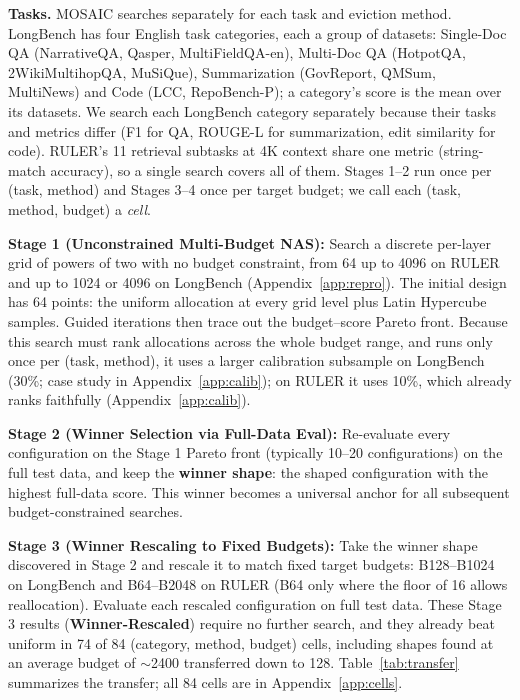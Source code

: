 \documentclass[11pt]{article}
\begin{document}
\textbf{Tasks.}\label{sec:method-tasks} MOSAIC searches separately for each task and eviction method. LongBench has four English task categories, each a group of datasets: Single-Doc QA (NarrativeQA, Qasper, MultiFieldQA-en), Multi-Doc QA (HotpotQA, 2WikiMultihopQA, MuSiQue), Summarization (GovReport, QMSum, MultiNews) and Code (LCC, RepoBench-P); a category's score is the mean over its datasets. We search each LongBench category separately because their tasks and metrics differ (F1 for QA, ROUGE-L for summarization, edit similarity for code). RULER's 11 retrieval subtasks at 4K context share one metric (string-match accuracy), so a single search covers all of them. Stages 1--2 run once per (task, method) and Stages 3--4 once per target budget; we call each (task, method, budget) a \emph{cell}.

\textbf{Stage 1 (Unconstrained Multi-Budget NAS):} Search a discrete per-layer grid of powers of two with no budget constraint, from 64 up to 4096 on RULER and up to 1024 or 4096 on LongBench (Appendix~\ref{app:repro}). The initial design has 64 points: the uniform allocation at every grid level plus Latin Hypercube samples. Guided iterations then trace out the budget--score Pareto front. Because this search must rank allocations across the whole budget range, and runs only once per (task, method), it uses a larger calibration subsample on LongBench (30\%; case study in Appendix~\ref{app:calib}); on RULER it uses 10\%, which already ranks faithfully (Appendix~\ref{app:calib}).

\textbf{Stage 2 (Winner Selection via Full-Data Eval):} Re-evaluate every configuration on the Stage 1 Pareto front (typically 10--20 configurations) on the full test data, and keep the \textbf{winner shape}: the shaped configuration with the highest full-data score. This winner becomes a universal anchor for all subsequent budget-constrained searches.



\textbf{Stage 3 (Winner Rescaling to Fixed Budgets):} Take the winner shape discovered in Stage 2 and rescale it to match fixed target budgets: B128--B1024 on LongBench and B64--B2048 on RULER (B64 only where the floor of 16 allows reallocation). Evaluate each rescaled configuration on full test data. These Stage 3 results (\textbf{Winner-Rescaled}) require no further search, and they already beat uniform in 74 of 84 (category, method, budget) cells, including shapes found at an average budget of $\sim$2400 transferred down to 128. Table~\ref{tab:transfer} summarizes the transfer; all 84 cells are in Appendix~\ref{app:cells}.
\end{document}
